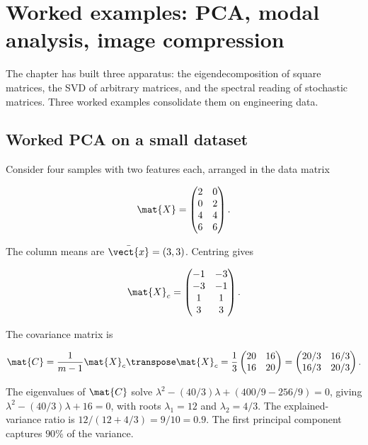 

\section{Worked examples: PCA, modal analysis, image compression}

The chapter has built three apparatus: the eigendecomposition of
square matrices, the SVD of arbitrary matrices, and the spectral
reading of stochastic matrices. Three worked examples consolidate
them on engineering data.

\subsection{Worked PCA on a small dataset}

Consider four samples with two features each, arranged in the
data matrix

\[
\mat{X} = \begin{pmatrix} 2 & 0 \\ 0 & 2 \\ 4 & 4 \\ 6 & 6
\end{pmatrix}.
\]

The column means are $\bar{\vect{x}} = (3, 3)$. Centring gives

\[
\mat{X}_{c} = \begin{pmatrix} -1 & -3 \\ -3 & -1 \\ 1 & 1 \\ 3 & 3
\end{pmatrix}.
\]

The covariance matrix is

\[
\mat{C} = \frac{1}{m-1} \mat{X}_{c}\transpose \mat{X}_{c}
= \frac{1}{3} \begin{pmatrix} 20 & 16 \\ 16 & 20 \end{pmatrix}
= \begin{pmatrix} 20/3 & 16/3 \\ 16/3 & 20/3 \end{pmatrix}.
\]

The eigenvalues of $\mat{C}$ solve $\lambda^{2} - (40/3)\lambda
+ (400/9 - 256/9) = 0$, giving $\lambda^{2} - (40/3)\lambda + 16 =
0$, with roots $\lambda_{1} = 12$ and $\lambda_{2} = 4/3$. The
explained-variance ratio is $12/(12 + 4/3) = 9/10 = 0.9$. The first
principal component captures $90\%$ of the variance.

